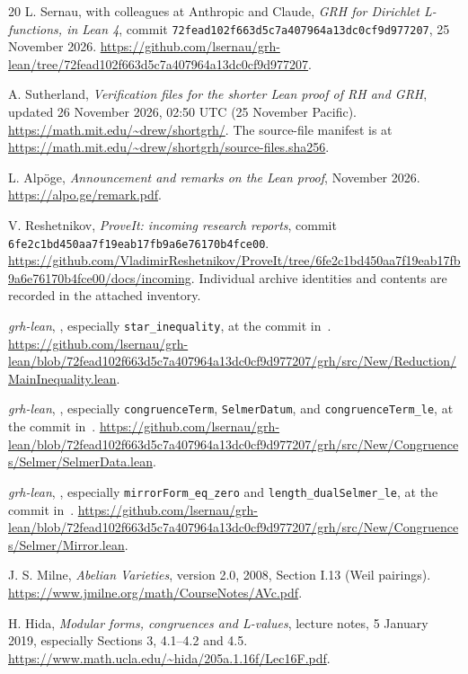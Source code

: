 \begin{thebibliography}{20}
L. Sernau, with colleagues at Anthropic and Claude,
\emph{GRH for Dirichlet L-functions, in Lean 4},
commit \nolinkurl{72fead102f663d5c7a407964a13dc0cf9d977207}, 25 November 2026.
\url{https://github.com/lsernau/grh-lean/tree/72fead102f663d5c7a407964a13dc0cf9d977207}.

A. Sutherland, \emph{Verification files for the shorter Lean proof of RH and GRH},
updated 26 November 2026, 02:50 UTC (25 November Pacific).
\url{https://math.mit.edu/~drew/shortgrh/}.
The source-file manifest is at
\url{https://math.mit.edu/~drew/shortgrh/source-files.sha256}.

L. Alp\"oge, \emph{Announcement and remarks on the Lean proof}, November 2026.
\url{https://alpo.ge/remark.pdf}.

V. Reshetnikov, \emph{ProveIt: incoming research reports},
commit \nolinkurl{6fe2c1bd450aa7f19eab17fb9a6e76170b4fce00}.
\url{https://github.com/VladimirReshetnikov/ProveIt/tree/6fe2c1bd450aa7f19eab17fb9a6e76170b4fce00/docs/incoming}.
Individual archive identities and contents are recorded in the attached inventory.

\emph{grh-lean}, ,
especially \texttt{star\_inequality}, at the commit in~\cite{repo}.
\url{https://github.com/lsernau/grh-lean/blob/72fead102f663d5c7a407964a13dc0cf9d977207/grh/src/New/Reduction/MainInequality.lean}.

\emph{grh-lean}, ,
especially \texttt{congruenceTerm}, \texttt{SelmerDatum}, and
\texttt{congruenceTerm\_le}, at the commit in~\cite{repo}.
\url{https://github.com/lsernau/grh-lean/blob/72fead102f663d5c7a407964a13dc0cf9d977207/grh/src/New/Congruences/Selmer/SelmerData.lean}.

\emph{grh-lean}, ,
especially \texttt{mirrorForm\_eq\_zero} and
\texttt{length\_dualSelmer\_le}, at the commit in~\cite{repo}.
\url{https://github.com/lsernau/grh-lean/blob/72fead102f663d5c7a407964a13dc0cf9d977207/grh/src/New/Congruences/Selmer/Mirror.lean}.

J. S. Milne, \emph{Abelian Varieties}, version 2.0, 2008, Section I.13
(Weil pairings).
\url{https://www.jmilne.org/math/CourseNotes/AVc.pdf}.

H. Hida, \emph{Modular forms, congruences and L-values}, lecture notes,
5 January 2019, especially Sections 3, 4.1--4.2 and 4.5.
\url{https://www.math.ucla.edu/~hida/205a.1.16f/Lec16F.pdf}.


\end{thebibliography}
